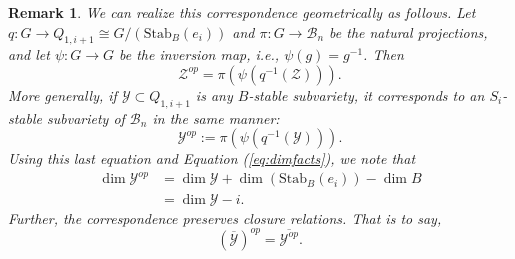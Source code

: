 \documentclass[12pt]{amsart}
\numberwithin{equation}{section}
\newtheorem{rem}[thm]{Remark}
\newcommand{\cZ}{{\mathcal Z}}
\newcommand{\B}{\mathcal{B}}
\begin{document}
\begin{rem}\label{r:corres}
 We can realize this correspondence geometrically as follows.  Let $q: G\to Q_{1,i+1}\cong G/(\mbox{Stab}_{B}(e_{i}))$ and $\pi: G\to \B_{n}$ be the natural projections, and let $\psi: G\to G$ be the inversion map, i.e., $\psi(g)=g^{-1}$.  Then 
\begin{equation*}
\cZ^{op}=\pi(\psi(q^{-1}(\cZ))).
\end{equation*}
More generally, if $\mathcal{Y}\subset Q_{1,i+1}$ is any $B$-stable subvariety, it 
corresponds to an $S_{i}$-stable subvariety of $\B_{n}$ in the same manner:
\begin{equation}\label{eq:Yop}
\mathcal{Y}^{op}:=\pi(\psi(q^{-1}(\mathcal{Y}))).
\end{equation}
Using this last equation and Equation (\ref{eq:dimfacts}), we note that 
\begin{equation}\label{eq:opdim}
\begin{split}
\dim \mathcal{Y}^{op}&=\dim \mathcal{Y}+\dim(\mbox{Stab}_{B}(e_{i}))-\dim B\\
&=\dim\mathcal{Y}-i.
\end{split}
\end{equation}
Further, the correspondence preserves closure relations.  That is to say, 
\begin{equation}\label{eq:closurecorres}
(\overline{\mathcal{Y}})^{op}=\overline{\mathcal{Y}^{op}}.
\end{equation}
\end{rem}
\end{document}
